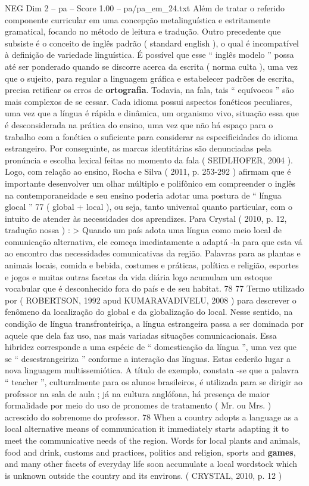 \begin{textsample}{NEG Dim 2 – pa – Score 1.00 – pa/pa\_em\_24.txt}
Além de tratar o referido componente curricular em uma concepção metalinguística e estritamente gramatical, focando no método de leitura e tradução.
Outro precedente que subsiste é o conceito de inglês padrão ( standard english ), o qual é incompatível à definição de variedade linguística.
É possível que esse “ inglês modelo ” possa até ser ponderado quando se discorre acerca da escrita ( norma culta ), uma vez que o sujeito, para regular a linguagem gráfica e estabelecer padrões de escrita, precisa retificar os erros de \textbf{ortografia}.
Todavia, na fala, tais “ equívocos ” são mais complexos de se cessar.
Cada idioma possui aspectos fonéticos peculiares, uma vez que a língua é rápida e dinâmica, um organismo vivo, situação essa que é desconsiderada na prática do ensino, uma vez que não há espaço para o trabalho com a fonética o suficiente para considerar as especificidades do idioma estrangeiro.
Por conseguinte, as marcas identitárias são denunciadas pela pronúncia e escolha lexical feitas no momento da fala ( SEIDLHOFER, 2004 ).
Logo, com relação ao ensino, Rocha e Silva ( 2011, p. 253-292 ) afirmam que é importante desenvolver um olhar múltiplo e polifônico em compreender o inglês na contemporaneidade e seu ensino poderia adotar uma postura de “ língua glocal ” 77 ( global + local ), ou seja, tanto universal quanto particular, com o intuito de atender às necessidades dos aprendizes.
Para Crystal ( 2010, p. 12, tradução nossa ) : > Quando um país adota uma língua como meio local de comunicação alternativa, ele começa imediatamente a adaptá -la para que esta vá ao encontro das necessidades comunicativas da região.
Palavras para as plantas e animais locais, comida e bebida, costumes e práticas, política e religião, esportes e jogos e muitas outras facetas da vida diária logo acumulam um estoque vocabular que é desconhecido fora do país e de seu habitat. 78 77 Termo utilizado por ( ROBERTSON, 1992 apud KUMARAVADIVELU, 2008 ) para descrever o fenômeno da localização do global e da globalização do local.
Nesse sentido, na condição de língua transfronteiriça, a língua estrangeira passa a ser dominada por aquele que dela faz uso, nas mais variadas situações comunicacionais.
Essa hibridez corresponde a uma espécie de “ domesticação da língua ”, uma vez que se “ desestrangeiriza ” conforme a interação das línguas.
Estas cederão lugar a nova linguagem multissemiótica.
A título de exemplo, constata -se que a palavra “ teacher ”, culturalmente para os alunos brasileiros, é utilizada para se dirigir ao professor na sala de aula ; já na cultura anglófona, há presença de maior formalidade por meio do uso de pronomes de tratamento ( Mr. ou Mrs. ) acrescido do sobrenome do professor. 78 When a country adopts a language as a local alternative means of communication it immediately starts adapting it to meet the communicative needs of the region.
Words for local plants and animals, food and drink, customs and practices, politics and religion, sports and \textbf{games}, and many other facets of everyday life soon accumulate a local wordstock which is unknown outside the country and its environs. ( CRYSTAL, 2010, p. 12 )

\end{textsample}
